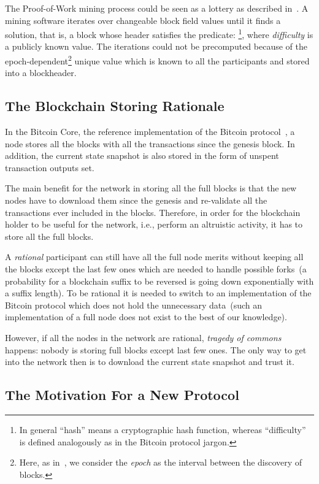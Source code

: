 \documentclass[conference,compsoc]{IEEEtran}
\begin{document}
The Proof-of-Work mining process could be seen as a lottery as described in~\cite{miller2014permacoin}. A mining software iterates over changeable block field values until it finds a solution, that is, a block whose header satisfies the predicate: \footnote{In general ``hash'' means a cryptographic hash function, whereas ``difficulty'' is defined analogously as in the Bitcoin protocol jargon.}, where \textit{difficulty} is a publicly known value. The iterations could not be precomputed because of the epoch-dependent\footnote{Here, as in~\cite{miller2014permacoin}, we consider the {\it epoch} as the interval between the discovery of blocks.} unique value which is known to all the participants and stored into a blockheader. 

\subsection{The Blockchain Storing Rationale}
\label{rationale}

In the Bitcoin Core, the reference implementation of the Bitcoin protocol~\cite{bitcoind}, a node stores all the blocks with all the transactions since the genesis block. In addition, the current state snapshot is also stored in the form of unspent transaction outputs set. 

The main benefit for the network in storing all the full blocks is that the new nodes have to download them since the genesis and re-validate all the transactions ever included in the blocks. Therefore, in order for the blockchain holder to be useful for the network, i.e., perform an  altruistic activity, it has to  store all the full blocks. 

A \textit{rational} participant can still have all the full node merits without  keeping all the blocks except the last few ones which are needed to handle possible forks~(a probability for a blockchain suffix to be reversed is going down exponentially with a suffix length). To be rational it is needed to switch to an implementation of the Bitcoin protocol which does not hold the unnecessary data~(such an implementation of a full node does not exist to the best of our knowledge). 

However, if all the nodes in the network are rational, \textit{tragedy of commons}~\cite{hardin1968commons} happens: nobody is storing full blocks except last few ones. The only way to get into the network then is to download the current state snapshot and trust it. 

\subsection{The Motivation For a New Protocol}
\label{section_motiv}
\end{document}
